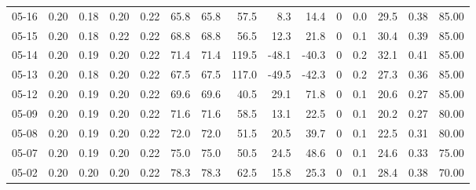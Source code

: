 \begin{threeparttable}
{\begin{tabular}{lrrrrrrrrrrrrrr}
  05-16 &          0.20 &          0.18 &          0.20 &        0.22 &                65.8 &               65.8 &                57.5 &        8.3 &         14.4 &              0 &                 0.0 &             29.5 &            0.38 &                  85.00 \\
  05-15 &          0.20 &          0.18 &          0.22 &        0.22 &                68.8 &               68.8 &                56.5 &       12.3 &         21.8 &              0 &                 0.1 &             30.4 &            0.39 &                  85.00 \\
  05-14 &          0.20 &          0.19 &          0.20 &        0.22 &                71.4 &               71.4 &               119.5 &      -48.1 &        -40.3 &              0 &                 0.2 &             32.1 &            0.41 &                  85.00 \\
  05-13 &          0.20 &          0.18 &          0.20 &        0.22 &                67.5 &               67.5 &               117.0 &      -49.5 &        -42.3 &              0 &                 0.2 &             27.3 &            0.36 &                  85.00 \\
  05-12 &          0.20 &          0.19 &          0.20 &        0.22 &                69.6 &               69.6 &                40.5 &       29.1 &         71.8 &              0 &                 0.1 &             20.6 &            0.27 &                  85.00 \\
  05-09 &          0.20 &          0.19 &          0.20 &        0.22 &                71.6 &               71.6 &                58.5 &       13.1 &         22.5 &              0 &                 0.1 &             20.2 &            0.27 &                  80.00 \\
  05-08 &          0.20 &          0.19 &          0.20 &        0.22 &                72.0 &               72.0 &                51.5 &       20.5 &         39.7 &              0 &                 0.1 &             22.5 &            0.31 &                  80.00 \\
  05-07 &          0.20 &          0.19 &          0.20 &        0.22 &                75.0 &               75.0 &                50.5 &       24.5 &         48.6 &              0 &                 0.1 &             24.6 &            0.33 &                  75.00 \\
  05-02 &          0.20 &          0.20 &          0.20 &        0.22 &                78.3 &               78.3 &                62.5 &       15.8 &         25.3 &              0 &                 0.1 &             28.4 &            0.38 &                  70.00 \\

\end{tabular}}
\end{threeparttable}
